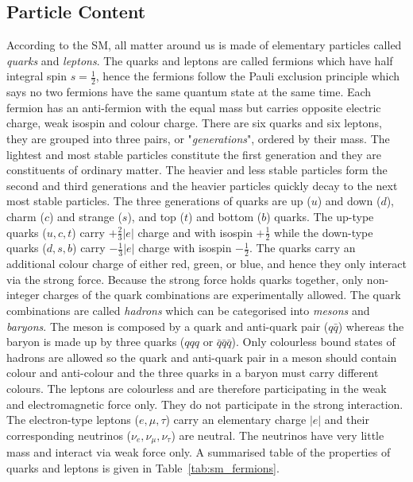 \subsection{Particle Content}
\label{subsec:sm_particle_content}
According to the SM, all matter around us is made of elementary particles called \textit{quarks} and \textit{leptons}.
The quarks and leptons are called fermions which have half integral spin $s=\frac{1}{2}$, hence the fermions follow the Pauli exclusion principle which says no two fermions have the same quantum state at the same time.
Each fermion has an anti-fermion with the equal mass but carries opposite electric charge, weak isospin and colour charge.
There are six quarks and six leptons, they are grouped into three pairs, or "\textit{generations}", ordered by their mass.
The lightest and most stable particles constitute the first generation and they are constituents of ordinary matter.
The heavier and less stable particles form the second and third generations and the heavier particles quickly decay to the next most stable particles.
The three generations of quarks are up ($u$) and down ($d$), charm ($c$) and strange ($s$), and top ($t$) and bottom ($b$) quarks.
The up-type quarks ($u, c, t$) carry $+\frac{2}{3}|e|$ charge and with isospin $+\frac{1}{2}$ while the down-type quarks ($d, s, b$) carry $-\frac{1}{3}|e|$ charge with isospin $-\frac{1}{2}$.
The quarks carry an additional colour charge of either red, green, or blue, and hence they only interact via the strong force.
Because the strong force holds quarks together, only non-integer charges of the quark combinations are experimentally allowed.
The quark combinations are called \textit{hadrons} which can be categorised into \textit{mesons} and \textit{baryons}.
The meson is composed by a quark and anti-quark pair ($q\bar{q}$) whereas the baryon is made up by three quarks ($qqq$ or $\bar{q}\bar{q}\bar{q}$).
Only colourless bound states of hadrons are allowed so the quark and anti-quark pair in a meson should contain colour and anti-colour and the three quarks in a baryon must carry different colours.
The leptons are colourless and are therefore participating in the weak and electromagnetic force only. 
They do not participate in the strong interaction.
The electron-type leptons ($e, \mu, \tau$) carry an elementary charge $|e|$ and their corresponding neutrinos ($\nu_{e}, \nu_{\mu}, \nu_{\tau}$) are neutral.
The neutrinos have very little mass and interact via weak force only.
A summarised table of the properties of quarks and leptons is given in Table~\ref{tab:sm_fermions}.

